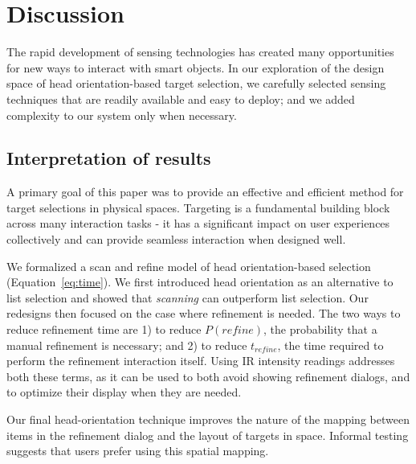 \section{Discussion}
\label{sec:discussion}
The rapid development of sensing technologies has created many opportunities for new ways to interact with smart objects. In our exploration of the design space of head orientation-based target selection, we carefully selected sensing techniques that are readily available and easy to deploy; and we added complexity to our system only when necessary. 

\subsection{Interpretation of results}

A primary goal of this paper was to provide an effective and efficient method for target selections in physical spaces. Targeting is a fundamental building block across many interaction tasks - it has a significant impact on user experiences collectively and can provide seamless interaction when designed well.

We formalized a scan and refine model of head orientation-based selection (Equation~\ref{eq:time}). We first introduced head orientation as an alternative to list selection and showed that {\em scanning} can outperform list selection. Our redesigns then focused on the case where refinement is needed. The two ways to reduce refinement time are 1) to reduce $P(refine)$, the probability that a manual refinement is necessary; and 2) to reduce $t_{refine}$, the time required to perform the refinement interaction itself. Using IR intensity readings addresses both these terms, as it can be used to both avoid showing refinement dialogs, and to optimize their display when they are needed. 

Our final head-orientation technique improves the nature of the mapping between items in the refinement dialog and the layout of targets in space. Informal testing suggests that users prefer using this spatial mapping.


